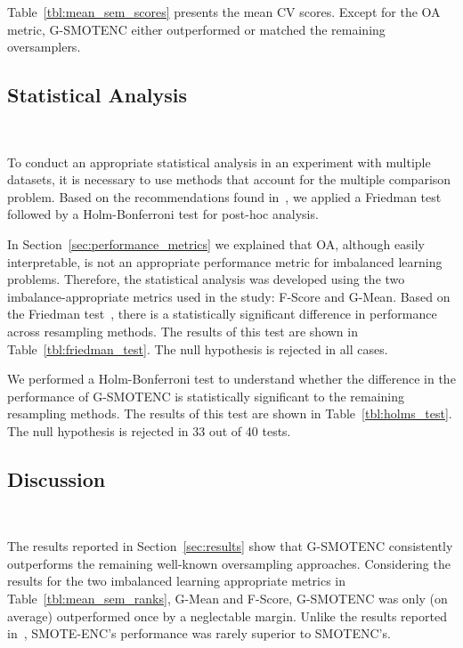\documentclass[preprint,12pt]{elsarticle}
\begin{document}
{

Table~\ref{tbl:mean_sem_scores} presents the mean CV scores.
Except for the OA metric, G-SMOTENC either outperformed or matched the
remaining oversamplers.



\subsection{Statistical Analysis}~\label{sec:statistical_analysis}

To conduct an appropriate statistical analysis in an experiment with multiple
datasets, it is necessary to use methods that account for the multiple
comparison problem. Based on the recommendations found in~\cite{Demsar2006},
we applied a Friedman test followed by a Holm-Bonferroni test for
post-hoc analysis.

In Section~\ref{sec:performance_metrics} we explained that OA, although easily
interpretable, is not an appropriate performance metric for imbalanced
learning problems. Therefore, the statistical analysis was developed using the
two imbalance-appropriate metrics used in the study: F-Score and G-Mean. Based
on the Friedman test~\cite{friedman1937use}, there is a statistically
significant difference in performance across resampling methods. The results
of this test are shown in Table~\ref{tbl:friedman_test}. The null hypothesis
is rejected in all cases.



We performed a Holm-Bonferroni test to understand whether the difference in
the performance of G-SMOTENC is statistically significant to the remaining
resampling methods. The results of this test are shown in
Table~\ref{tbl:holms_test}. The null hypothesis is rejected in 33 out of 40
tests.



\subsection{Discussion}~\label{sec:discussion}

The results reported in Section~\ref{sec:results} show that G-SMOTENC
consistently outperforms the remaining well-known oversampling approaches.
Considering the results for the two imbalanced learning appropriate metrics in
Table~\ref{tbl:mean_sem_ranks}, G-Mean and F-Score, G-SMOTENC was only (on
average) outperformed once by a neglectable margin. Unlike the results
reported in~\cite{mukherjee2021smote}, SMOTE-ENC's performance was rarely
superior to SMOTENC's.

}
\end{document}
